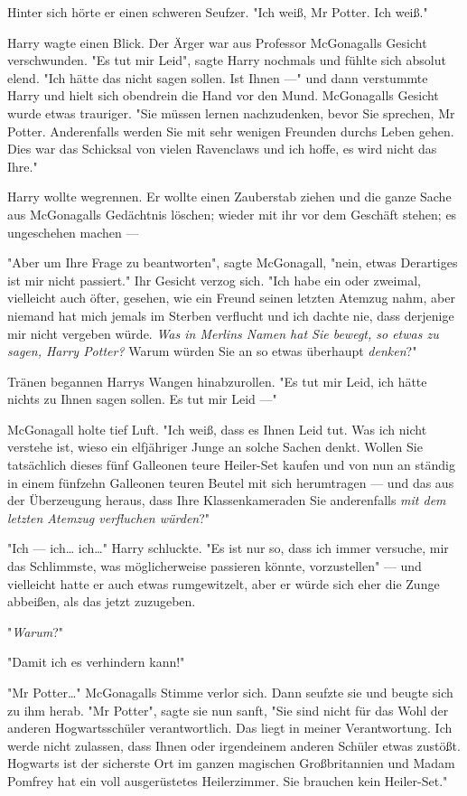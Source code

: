 {Hinter sich hörte er einen schweren Seufzer. "Ich weiß, Mr Potter. Ich weiß."

Harry wagte einen Blick. Der Ärger war aus Professor McGonagalls Gesicht verschwunden. "Es tut mir Leid", sagte Harry nochmals und fühlte sich absolut elend. "Ich hätte das nicht sagen sollen. Ist Ihnen ---" und dann verstummte Harry und hielt sich obendrein die Hand vor den Mund. McGonagalls Gesicht wurde etwas trauriger. "Sie müssen lernen nachzudenken, bevor Sie sprechen, Mr Potter. Anderenfalls werden Sie mit sehr wenigen Freunden durchs Leben gehen. Dies war das Schicksal von vielen Ravenclaws und ich hoffe, es wird nicht das Ihre."

Harry wollte wegrennen. Er wollte einen Zauberstab ziehen und die ganze Sache aus McGonagalls Gedächtnis löschen; wieder mit ihr vor dem Geschäft stehen; es ungeschehen machen ---

"Aber um Ihre Frage zu beantworten", sagte McGonagall, "nein, etwas Derartiges ist mir nicht passiert." Ihr Gesicht verzog sich. "Ich habe ein oder zweimal, vielleicht auch öfter, gesehen, wie ein Freund seinen letzten Atemzug nahm, aber niemand hat mich jemals im Sterben verflucht und ich dachte nie, dass derjenige mir nicht vergeben würde. \emph{Was in Merlins Namen hat Sie bewegt, so etwas zu sagen, Harry Potter?} Warum würden Sie an so etwas überhaupt \emph{denken}?"

Tränen begannen Harrys Wangen hinabzurollen. "Es tut mir Leid, ich hätte nichts zu Ihnen sagen sollen. Es tut mir Leid ---"

McGonagall holte tief Luft. "Ich weiß, dass es Ihnen Leid tut. Was ich nicht verstehe ist, wieso ein elfjähriger Junge an solche Sachen denkt. Wollen Sie tatsächlich dieses fünf Galleonen teure Heiler-Set kaufen und von nun an ständig in einem fünfzehn Galleonen teuren Beutel mit sich herumtragen --- und das aus der Überzeugung heraus, dass Ihre Klassenkameraden Sie anderenfalls \emph{mit dem letzten Atemzug verfluchen würden}?"

"Ich --- ich… ich…" Harry schluckte. "Es ist nur so, dass ich immer versuche, mir das Schlimmste, was möglicherweise passieren könnte, vorzustellen" --- und vielleicht hatte er auch etwas rumgewitzelt, aber er würde sich eher die Zunge abbeißen, als das jetzt zuzugeben.

"\emph{Warum}?"

"Damit ich es verhindern kann!"

"Mr Potter…" McGonagalls Stimme verlor sich. Dann seufzte sie und beugte sich zu ihm herab. "Mr Potter", sagte sie nun sanft, "Sie sind nicht für das Wohl der anderen Hogwartsschüler verantwortlich. Das liegt in meiner Verantwortung. Ich werde nicht zulassen, dass Ihnen oder irgendeinem anderen Schüler etwas zustößt. Hogwarts ist der sicherste Ort im ganzen magischen Großbritannien und Madam Pomfrey hat ein voll ausgerüstetes Heilerzimmer. Sie brauchen kein Heiler-Set."

}
